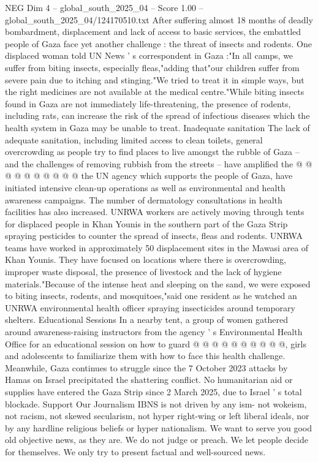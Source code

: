 \begin{textsample}{NEG Dim 4 – global\_south\_2025\_04 – Score 1.00 – global\_south\_2025\_04/124170510.txt}  \label{ex:f4_neg_219}
After suffering almost 18 months of deadly bombardment, displacement and lack of access to basic services, the embattled people of Gaza face yet another challenge : the threat of insects and rodents.
One displaced woman told UN News ' s correspondent in Gaza :"In all camps, we suffer from biting insects, especially fleas,"adding that"our children suffer from severe pain due to itching and stinging."We tried to treat it in simple ways, but the right medicines are not available at the medical centre."While biting insects found in Gaza are not immediately life-threatening, the presence of rodents, including rats, can increase the risk of the spread of infectious diseases which the health system in Gaza may be unable to treat.
Inadequate sanitation The lack of adequate sanitation, including limited access to clean toilets, general overcrowding as people try to find places to live amongst the rubble of Gaza -- and the challenges of removing rubbish from the streets -- have amplified the @ @ @ @ @ @ @ @ @ @ the UN agency which supports the people of Gaza, have initiated intensive clean-up operations as well as environmental and health awareness campaigns.
The number of dermatology consultations in health facilities has also increased.
UNRWA workers are actively moving through tents for displaced people in Khan Younis in the southern part of the Gaza Strip spraying pesticides to counter the spread of insects, fleas and rodents.
UNRWA teams have worked in approximately 50 displacement sites in the Mawasi area of Khan Younis.
They have focused on locations where there is overcrowding, improper waste disposal, the presence of livestock and the lack of hygiene materials."Because of the intense heat and sleeping on the sand, we were exposed to biting insects, rodents, and mosquitoes,"said one resident as he watched an UNRWA environmental health officer spraying insecticides around temporary shelters.
Educational Sessions In a nearby tent, a group of women gathered around awareness-raising instructors from the agency ' s Environmental Health Office for an educational session on how to guard @ @ @ @ @ @ @ @ @ @, girls and adolescents to familiarize them with how to face this health challenge.
Meanwhile, Gaza continues to struggle since the 7 October 2023 attacks by Hamas on Israel precipitated the shattering conflict.
No humanitarian aid or supplies have entered the Gaza Strip since 2 March 2025, due to Israel ' s total blockade.
Support Our Journalism IBNS is not driven by any ism- not wokeism, not racism, not skewed secularism, not hyper right-wing or left liberal ideals, nor by any hardline religious beliefs or hyper nationalism.
We want to serve you good old objective news, as they are.
We do not judge or preach.
We let people decide for themselves.
We only try to present factual and well-sourced news.

\end{textsample}
